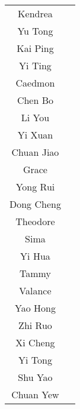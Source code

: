 \documentclass[a4paper]{article}
\begin{document}
\begin{center}
    \begin{tabular}{cc}
        Kendrea&\\
        Yu Tong&\\
        Kai Ping&\\
        Yi Ting&\\
        Caedmon&\\
        Chen Bo&\\
        Li You&\\
        Yi Xuan&\\
        Chuan Jiao&\\
        Grace&\\
        Yong Rui&\\
        Dong Cheng&\\
        Theodore&\\
        Sima&\\
        Yi Hua&\\
        Tammy&\\
        Valance&\\
        Yao Hong&\\
        Zhi Ruo&\\
        Xi Cheng&\\
        Yi Tong&\\
        Shu Yao&\\
        Chuan Yew&
    \end{tabular}
\end{center}
\end{document}

